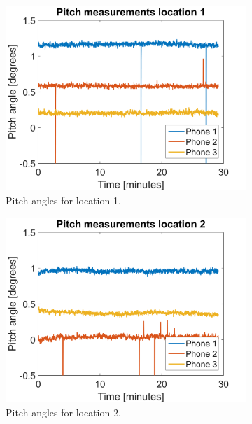 \documentclass[a4paper, notitlepage]{report}
\begin{document}
\begin{figure}[H]
\begin{adjustwidth}{-1in}{-1in}
	\vspace{10pt}
	\begin{subfigure}{0.33\textwidth}
		\includegraphics[width=\textwidth]{figures/orientation/pi_loc1}
		\caption{Pitch angles for location 1.}
		\label{app:orientation_pi_loc1}
	\end{subfigure}
	\begin{subfigure}{0.33\textwidth}
		\includegraphics[width=\textwidth]{figures/orientation/pi_loc2}
		\caption{Pitch angles for location 2.}
		\label{app:orientation_pi_loc2}
	\end{subfigure}
	\begin{subfigure}{0.33\textwidth}

\end{subfigure}
\end{adjustwidth}
\end{figure}
\end{document}
